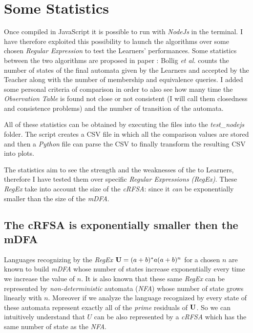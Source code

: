 \section{Some Statistics}

Once compiled in JavaScript it is possible to run with \textit{NodeJs} in the terminal. I have therefore exploited this possibility to launch the algorithms over some chosen \textit{Regular Expression} to test the Learners' performances. Some statistics between the two algorithms are proposed in paper \cite{NLPaper}: Bollig \textit{et al.} counts the number of states of the final automata given by the Learners and accepted by the Teacher along with the number of membership and equivalence queries. I added some personal criteria of comparison in order to also see how many time the \textit{Observation Table} is found not close or not consistent (I will call them closedness and consistence problems) and the number of transition of the automata.

All of these statistics can be obtained by executing the files into the \textit{test\_nodejs} folder. The script creates a CSV file in which all the comparison values are stored and then a \textit{Python} file can parse the CSV to finally transform the resulting CSV into plots.

The statistics aim to see the strength and the weaknesses of the to Learners, therefore I have tested them over specific \textit{Regular Expressions (RegEx)}. These \textit{RegEx} take into account the size of the \textit{cRFSA}: since it \textit{can} be exponentially smaller than the size of the \textit{mDFA}.

\subsection{The cRFSA is exponentially smaller then the mDFA}
Languages recognizing by the \textit{RegEx} $\mathbf{U} = (a+b)^*a(a+b)^n$ for a chosen $n$ are known to build \textit{mDFA} whose number of states increase exponentially every time we increase the value of $n$. It is also known that these same \textit{RegEx} can be represented by \textit{non-deterministic} automata (\textit{NFA}) whose number of state grows linearly with $n$. Moreover if we analyze the language recognized by every state of these automata represent exactly all of the \textit{prime} residuals of $\mathbf{U}$. So we can intuitively understand that $U$ can be also represented by a \textit{cRFSA} which has the same number of state as the \textit{NFA}.

